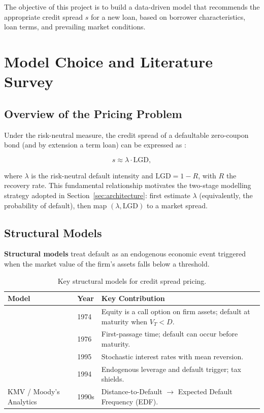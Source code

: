 \documentclass[12pt, a4paper]{article}
\theoremstyle{definition}
\begin{document}
The objective of this project is to build a data-driven model that recommends the
appropriate credit spread $s$ for a new loan, based on borrower characteristics,
loan terms, and prevailing market conditions.

\section{Model Choice and Literature Survey}
\label{sec:literature}

\subsection{Overview of the Pricing Problem}

Under the risk-neutral measure, the credit spread of a defaultable zero-coupon bond
(and by extension a term loan) can be expressed as
\citep{duffie1999modeling}:

\begin{equation}
  s \approx \lambda \cdot \text{LGD},
  \label{eq:duffiesingelton}
\end{equation}

\noindent where $\lambda$ is the risk-neutral default intensity and $\text{LGD} = 1 - R$,
with $R$ the recovery rate.
This fundamental relationship motivates the two-stage modelling strategy adopted in
Section~\ref{sec:architecture}: first estimate $\lambda$ (equivalently, the
probability of default), then map $(\lambda, \text{LGD})$ to a market spread.

\subsection{Structural Models}

\textbf{Structural models} treat default as an endogenous economic event triggered
when the market value of the firm's assets falls below a threshold.

\begin{table}[H]
\centering
\caption{Key structural models for credit spread pricing.}
\label{tab:structural}
\begin{tabular}{llp{7cm}}
\toprule
\textbf{Model} & \textbf{Year} & \textbf{Key Contribution} \\
\midrule
\citet{merton1974pricing}   & 1974 & Equity is a call option on firm assets; default at maturity when $V_T < D$. \\
\citet{blackcox1976}        & 1976 & First-passage time; default can occur before maturity. \\
\citet{longstaffschwartz1995} & 1995 & Stochastic interest rates with mean reversion. \\
\citet{leland1994}          & 1994 & Endogenous leverage and default trigger; tax shields. \\
KMV / Moody's Analytics     & 1990s & Distance-to-Default $\to$ Expected Default Frequency (EDF). \\
\bottomrule
\end{tabular}
\end{table}
\end{document}
